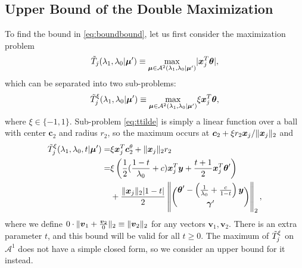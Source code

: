 \subsection{Upper Bound of the Double Maximization}
\label{sec:double-bound}

To find the bound in \eqref{eq:boundbound}, let us first consider the maximization problem
\begin{equation}
    \Tilde{T}_j(\lambda_1,\lambda_0|\boldsymbol\mu')\equiv\underset{\boldsymbol\mu\in\mathcal{A}^2(\lambda_1,\lambda_0|\boldsymbol\mu')}{\mathrm{max}}|\boldsymbol x_j^T\boldsymbol\theta|,
\end{equation}
which can be separated into two sub-problems:
\begin{equation}
    \label{eq:ttilde}
    \Tilde{T}^\xi_j(\lambda_1,\lambda_0|\boldsymbol\mu')\equiv\underset{\boldsymbol\mu\in\mathcal{A}^2(\lambda_1,\lambda_0|\boldsymbol\mu')}{\mathrm{max}}\xi \boldsymbol x_j^T\boldsymbol\theta,
\end{equation}
where $\xi\in\{-1,1\}$. Sub-problem \eqref{eq:ttilde} is simply a linear function over a ball with center $\boldsymbol c_2$ and radius $r_2$, so the maximum occurs at $\boldsymbol c_2 +\xi r_2 \boldsymbol x_j / \lVert\boldsymbol x_j\rVert_2$ and
\begin{gather}
    \label{eq:ttildexi}
    \begin{aligned}
        \Tilde{T}^\xi_j(\lambda_1,\lambda_0,t|\boldsymbol\mu')=&\xi\boldsymbol x_j^T\boldsymbol c_2^\theta+\lVert\boldsymbol x_j\rVert_2r_2\\
        =&\xi\left( \frac{1}{2}(\frac{1-t}{\lambda_0}+c)\boldsymbol x_j^T\boldsymbol y+\frac{t+1}{2}\boldsymbol x_j^T\boldsymbol\theta'\right)\\
        &+\frac{\lVert\boldsymbol x_j\rVert_2|1-t|}{2}\left\Vert\binom{\boldsymbol\theta'-\left(\frac{1}{\lambda_0}+\frac{c}{1-t}\right)\boldsymbol y}{\boldsymbol\gamma'}\right\Vert_2,\\
    \end{aligned}
\end{gather}
where we define $0\cdot\lVert\boldsymbol v_1+\frac{\boldsymbol v_2}{0}\rVert_2\equiv \lVert\boldsymbol v_2\rVert_2$ for any vectors $\boldsymbol v_1,\boldsymbol v_2$. There is an extra parameter $t$, and this bound will be valid for all $t\geq 0$. The maximum of $\Tilde{T}^\xi_j$ on $\mathcal{A}^1$ does not have a simple closed form, so we consider an upper bound for it instead.

